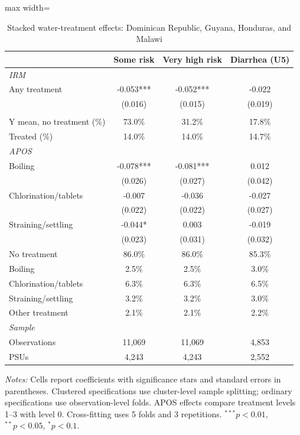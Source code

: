 \begin{table}[htbp]
\centering
\caption{Stacked water-treatment effects: Dominican Republic, Guyana, Honduras, and Malawi}
\label{tab:water-treatment-main-selected-countries}
\scriptsize
\setlength{\tabcolsep}{4pt}
\renewcommand{\arraystretch}{0.92}
\begin{adjustbox}{max width=\linewidth}
\begin{tabular}{lccc}
\hline\hline
 & Some risk & Very high risk & Diarrhea (U5) \\
\hline
\multicolumn{4}{l}{\textit{IRM}} \\
Any treatment & -0.053*** & -0.052*** & -0.022 \\
 & (0.016) & (0.015) & (0.019) \\
\addlinespace[6pt]
\multicolumn{4}{l}{\textit{Descriptive statistics}} \\
Y mean, no treatment (\%) & 73.0\% & 31.2\% & 17.8\% \\
Treated (\%) & 14.0\% & 14.0\% & 14.7\% \\
\midrule
\multicolumn{4}{l}{\textit{APOS}} \\
Boiling & -0.078*** & -0.081*** & 0.012 \\
 & (0.026) & (0.027) & (0.042) \\
Chlorination/tablets & -0.007 & -0.036 & -0.027 \\
 & (0.022) & (0.022) & (0.027) \\
Straining/settling & -0.044* & 0.003 & -0.019 \\
 & (0.023) & (0.031) & (0.032) \\
\addlinespace[6pt]
No treatment & 86.0\% & 86.0\% & 85.3\% \\
Boiling & 2.5\% & 2.5\% & 3.0\% \\
Chlorination/tablets & 6.3\% & 6.3\% & 6.5\% \\
Straining/settling & 3.2\% & 3.2\% & 3.0\% \\
Other treatment & 2.1\% & 2.1\% & 2.2\% \\
\midrule
\multicolumn{4}{l}{\textit{Sample}} \\
Observations & 11,069 & 11,069 & 4,853 \\
PSUs & 4,243 & 4,243 & 2,552 \\
\hline\hline
\end{tabular}
\end{adjustbox}
\par\vspace{3pt}
\begin{minipage}{\linewidth}\scriptsize \textit{Notes:} Cells report coefficients with significance stars and standard errors in parentheses. Clustered specifications use cluster-level sample splitting; ordinary specifications use observation-level folds. APOS effects compare treatment levels 1--3 with level 0. Cross-fitting uses 5 folds and 3 repetitions. $^{***}p<0.01$, $^{**}p<0.05$, $^{*}p<0.1$.\end{minipage}
\end{table}